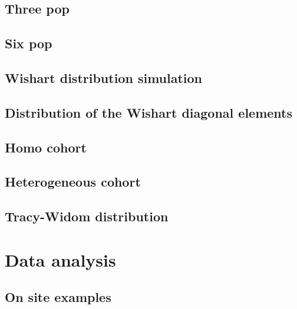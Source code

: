 \documentclass[]{book}
\begin{document}
\hypertarget{three-pop}{%
\section{Three pop}\label{three-pop}}

\hypertarget{six-pop}{%
\section{Six pop}\label{six-pop}}

\hypertarget{wishart-distribution-simulation}{%
\section{Wishart distribution
simulation}\label{wishart-distribution-simulation}}

\hypertarget{distribution-of-the-wishart-diagonal-elements}{%
\section{Distribution of the Wishart diagonal
elements}\label{distribution-of-the-wishart-diagonal-elements}}

\hypertarget{homo-cohort}{%
\section{Homo cohort}\label{homo-cohort}}

\hypertarget{heterogeneous-cohort}{%
\section{Heterogeneous cohort}\label{heterogeneous-cohort}}

\hypertarget{tracy-widom-distribution}{%
\section{Tracy-Widom distribution}\label{tracy-widom-distribution}}

\hypertarget{data-analysis}{%
\chapter{Data analysis}\label{data-analysis}}

\hypertarget{on-site-examples}{%
\section{On site examples}\label{on-site-examples}}
\end{document}
